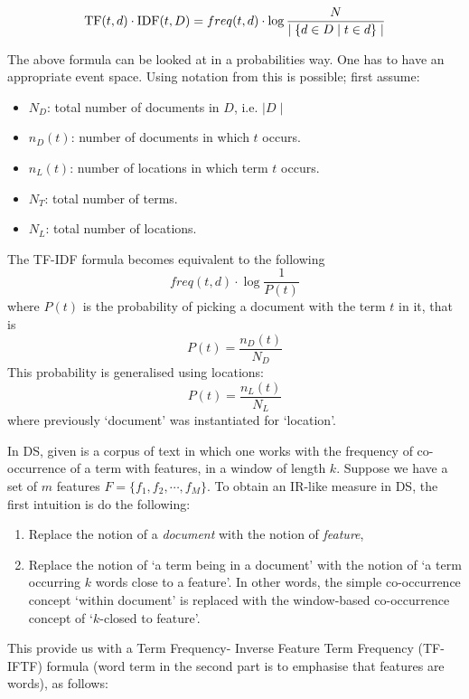 \begin{equation}
\label{tf-idf}
\textmd{TF}(t,d) \cdot \textmd{IDF}(t, D) = freq(t, d) \cdot \log{{N} \over {\mid \{d \in D \mid t \in d\}\mid}}
\end{equation}

The above formula can be looked at in a probabilities way. One has to have an appropriate event space.  Using notation from   \cite{ThomasBook} this is possible;  first assume:
\begin{itemize}
\item $N_D$: total number of documents in $D$, i.e.   $\mid D \mid$
\item $n_D(t)$: number of documents in which $t$ occurs.
\item $n_L(t)$: number of locations in which  term $t$ occurs.
\item $N_T$: total number of terms.
\item $N_L$: total number of locations.
\end{itemize}

The  TF-IDF formula becomes equivalent to the following 
\[
 freq(t, d) \cdot \log{\frac{1}{P(t)}}
\]
where $P(t)$  is the probability of picking a document with the term $t$ in it, that is 
\[
P(t) = \frac{n_D(t)}{N_D} 
\]
This probability is generalised using locations:  
\[
P(t) = \frac{n_L(t)}{N_L}
\] 
where previously  `document' was instantiated for `location'. 


\medskip
In DS, given is a corpus of text in which one works with the frequency of co-occurrence of a term with  features, in a window of length $k$.  Suppose we have a set of  $m$ features  $F = \{f_1, f_2, \cdots, f_M\}$.  To obtain an IR-like measure in DS, the first intuition is do the following:

\begin{enumerate}
\item   Replace the notion of a  \emph{document}  with the notion of  \emph{feature}, 
\item  Replace the notion of `a term being in a document'  with the notion of `a term occurring $k$ words close to a feature'.  In other words,  the  simple co-occurrence concept `within document' is replaced with the window-based co-occurrence concept of  `$k$-closed to feature'. 
\end{enumerate}

This provide  us with a Term Frequency- Inverse Feature Term Frequency  (TF-IFTF) formula (word term in the second part is to emphasise that features are words),   as follows:


